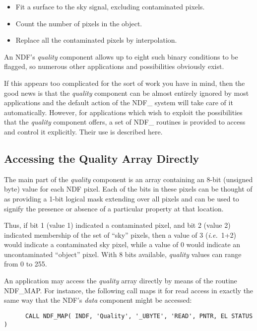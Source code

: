 \documentclass[twoside,11pt]{article}
\newcommand{\htmlref}[2]{#1}
\newcommand{\xlabel}[1]{}
\newcommand{\st}[1]{{\em{#1}}}
\begin{document}
\begin{itemize}
\item Fit a surface to the sky signal, excluding contaminated pixels.
\item Count the number of pixels in the object.
\item Replace all the contaminated pixels by interpolation.
\end{itemize}

An NDF's \st{quality\/} component allows up to eight such binary conditions to be
flagged, so numerous other applications and possibilities obviously exist. 

If this appears too complicated for the sort of work you have in mind, then  the
good news is that the \st{quality\/} component can be almost entirely ignored  by
most applications and the default action of the NDF\_ system will take  care of
it automatically.
However, for applications which wish to exploit the possibilities that the 
\st{quality\/} component offers, a set of NDF\_ routines is provided to access
and  control it explicitly.
Their use is described here.

\subsection{\xlabel{accessing_the_quality_array_directly}Accessing the Quality Array Directly}

The main part of the \st{quality\/} component is an array containing an 8-bit 
(unsigned byte) value for each NDF pixel.
Each of the bits in these pixels can be thought of as providing a 1-bit 
logical mask extending over all pixels and can be used to signify the 
presence or absence of a particular property at that location.

Thus, if bit 1 (value 1) indicated a contaminated pixel, and bit 2 (value 2) 
indicated membership of the set of ``sky'' pixels, then a value of 3
(\st{i.e.}\ 1+2) would indicate a contaminated sky pixel, while a
value of 0 
would indicate an uncontaminated ``object'' pixel. 
With 8 bits available, \st{quality\/} values can range from 0 to 255.

An application may access the \st{quality\/} array directly by means of the
routine  \htmlref{NDF\_MAP}{NDF_MAP}.
For instance, the following call maps it for read access in exactly the same 
way that the NDF's \st{data\/} component might be accessed:

\small
\begin{verbatim}
      CALL NDF_MAP( INDF, 'Quality', '_UBYTE', 'READ', PNTR, EL STATUS )
\end{verbatim}
\normalsize
\end{document}
